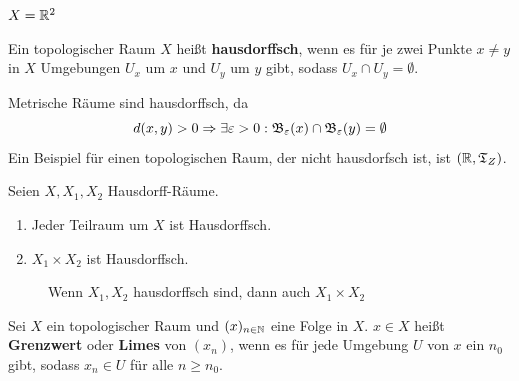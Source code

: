 \begin{beispiel} 
    $X = \mathbb{R}^2$ 

    
\end{beispiel}

\begin{definition} 
    Ein topologischer Raum $X$ heißt \textbf{hausdorffsch}, wenn es
    für je zwei Punkte $x \neq y$ in $X$ Umgebungen $U_x$ um $x$
    und $U_y$ um $y$ gibt, sodass $U_x \cap U_y = \emptyset$.
\end{definition}

\begin{bemerkung}[Trennungseigenschaft]\label{Trennungseigenschaft}
    Metrische Räume sind hausdorffsch, da 
    \[d(x,y) > 0 \Rightarrow \exists \varepsilon > 0: \mathfrak{B}_\varepsilon(x) \cap \mathfrak{B}_\varepsilon(y) = \emptyset\]
    Ein Beispiel für einen topologischen Raum, der nicht hausdorfsch ist,
    ist $(\mathbb{R}, \mathfrak{T}_Z)$.
\end{bemerkung}

\begin{bemerkung}
    Seien $X, X_1, X_2$ Hausdorff-Räume.
    \begin{enumerate}[label=\alph*)]
        \item Jeder Teilraum um $X$ ist Hausdorffsch.
        \item $X_1 \times X_2$ ist Hausdorffsch.
    \end{enumerate}
    \begin{figure}[htp]
        \centering
        
        \caption{Wenn $X_1, X_2$ hausdorffsch sind, dann auch $X_1 \times X_2$}
    \end{figure}
\end{bemerkung}

\begin{definition}  
    Sei $X$ ein topologischer Raum und $(x)_{n \in \mathbb{N}}$ eine Folge
    in $X$. $x \in X$ heißt \textbf{Grenzwert} oder \textbf{Limes}
    von $(x_n)$, wenn es für jede Umgebung $U$ von $x$ ein $n_0$ gibt,
    sodass $x_n \in U$ für alle $n \geq n_0$.
\end{definition}

